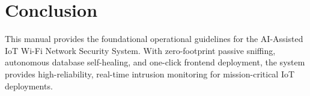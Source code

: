 \documentclass[11pt,a4paper]{article}
\begin{document}
\section{Conclusion}
This manual provides the foundational operational guidelines for the AI-Assisted IoT Wi-Fi Network Security System. With zero-footprint passive sniffing, autonomous database self-healing, and one-click frontend deployment, the system provides high-reliability, real-time intrusion monitoring for mission-critical IoT deployments.
\end{document}
